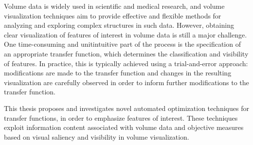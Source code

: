 \documentclass[a4paper, 12pt, twoside, openright]{report}         %
\begin{document}
\begin{thesisabstract}
	
Volume data is widely used in scientific and medical research, and volume visualization techniques aim to provide effective and flexible methods for analyzing and exploring complex structures in such data. However, obtaining clear visualization of features of interest in volume data is still a major challenge.
One time-consuming and unitintuitive part of the process is the specification of an appropriate transfer function, which determines the classification and visibility of features. In practice, this is typically achieved using a trial-and-error approach: modifications are made to the transfer function and changes in the resulting visualization are carefully observed in order to inform further modifications to the transfer function.

This thesis proposes and investigates novel automated optimization techniques for transfer functions, in order to emphasize features of interest. These techniques exploit information content associated with volume data and objective measures based on visual saliency and visibility in volume visualization.


\end{thesisabstract}
\end{document}
